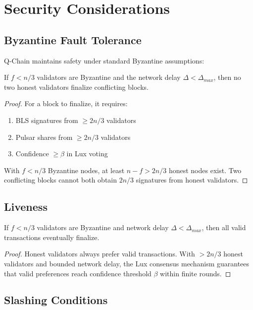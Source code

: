 \section{Security Considerations}


\subsection{Byzantine Fault Tolerance}

Q-Chain maintains safety under standard Byzantine assumptions:

\begin{theorem}[Safety]
If $f < n/3$ validators are Byzantine and the network delay $\Delta < \Delta_{max}$, then no two honest validators finalize conflicting blocks.
\end{theorem}

\begin{proof}
For a block to finalize, it requires:
\begin{enumerate}
\item BLS signatures from $\geq 2n/3$ validators
\item Pulsar shares from $\geq 2n/3$ validators
\item Confidence $\geq \beta$ in Lux voting
\end{enumerate}

With $f < n/3$ Byzantine nodes, at least $n - f > 2n/3$ honest nodes exist. Two conflicting blocks cannot both obtain $2n/3$ signatures from honest validators.
\end{proof}

\subsection{Liveness}

\begin{theorem}[Liveness]
If $f < n/3$ validators are Byzantine and network delay $\Delta < \Delta_{max}$, then all valid transactions eventually finalize.
\end{theorem}

\begin{proof}
Honest validators always prefer valid transactions. With $>2n/3$ honest validators and bounded network delay, the Lux consensus mechanism guarantees that valid preferences reach confidence threshold $\beta$ within finite rounds.
\end{proof}

\subsection{Slashing Conditions}

